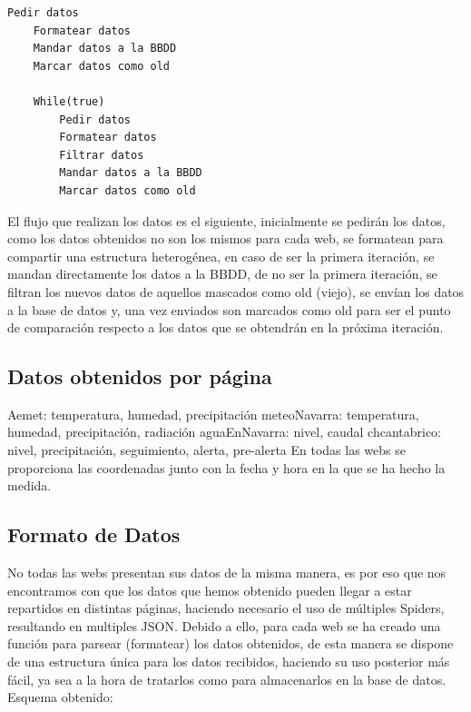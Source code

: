 \begin{lstlisting}[caption={Flujo de obtencion y tratamiento de los datos}]
	Pedir datos
	Formatear datos
	Mandar datos a la BBDD
	Marcar datos como old
	
	While(true)
		Pedir datos
		Formatear datos
		Filtrar datos
		Mandar datos a la BBDD
		Marcar datos como old
\end{lstlisting}

El flujo que realizan los datos es el siguiente, inicialmente se pedirán los datos, como los datos obtenidos no son los mismos para cada web, se formatean para compartir una estructura heterogénea, en caso de ser la primera iteración, se mandan directamente los datos a la BBDD, de no ser la primera iteración, se filtran los nuevos datos de aquellos mascados como old (viejo), se envían los datos a la base de datos y, una vez enviados son marcados como old para ser el punto de comparación respecto a los datos que se obtendrán en la próxima iteración.

\subsection{Datos obtenidos por página}
Aemet:\newline
temperatura, humedad, precipitación
\newline\newline
meteoNavarra:\newline
temperatura, humedad, precipitación, radiación
\newline\newline
aguaEnNavarra:\newline
nivel, caudal
\newline\newline
chcantabrico:\newline
nivel, precipitación, seguimiento, alerta, pre-alerta
\newline\newline
En todas las webs se proporciona las coordenadas junto con la fecha y hora en la que se ha hecho la medida.

\subsection{Formato de Datos}
No todas las webs presentan sus datos de la misma manera, es por eso que nos encontramos con que los datos que hemos obtenido pueden llegar a estar repartidos en distintas páginas, haciendo necesario el uso de múltiples Spiders, resultando en multiples JSON.\newline
\newline
Debido a ello, para cada web se ha creado una función para parsear (formatear) los datos obtenidos, de esta manera se dispone de una estructura única para los datos recibidos, haciendo su uso posterior más fácil, ya sea a la hora de tratarlos como para almacenarlos en la base de datos.\newline
\newline
Esquema obtenido:

